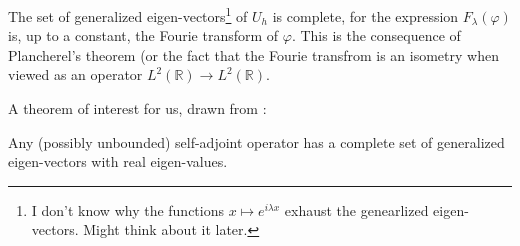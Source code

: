 \begin{example}
The set of generalized eigen-vectors\footnote{I don't know why the functions $x \mapsto e^{i\lambda x}$ exhaust the genearlized eigen-vectors. Might think about it later.} of $U_h$ is complete, for the expression $F_{\lambda}(\varphi)$ is, up to a constant, the Fourie transform of $\varphi$. This is the consequence of Plancherel's theorem (or the fact that the Fourie transfrom is an isometry when viewed as an operator $L^2(\mathbb R) \rightarrow L^2(\mathbb R)$.
\end{example}
A theorem of interest for us, drawn from \cite{gelfand}:
\begin{theorem}
Any (possibly unbounded) self-adjoint operator has a complete set of generalized eigen-vectors with real eigen-values.
\end{theorem}
